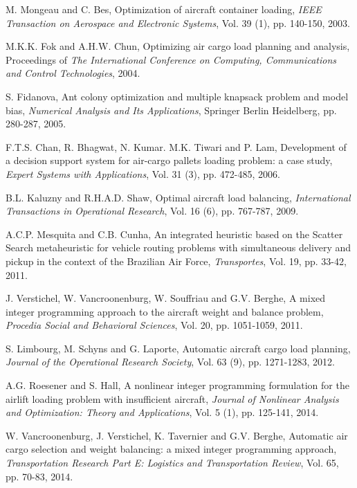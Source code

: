 \documentclass[preprint]{elsarticle}
\begin{document}
\begin{thebibliography}{00}
 M. Mongeau and C. Bes, Optimization of aircraft container loading, {\it IEEE Transaction on Aerospace and Electronic Systems}, Vol. 39 (1), pp. 140-150, 2003.

 M.K.K. Fok and A.H.W. Chun, Optimizing air cargo load planning and analysis, Proceedings of {\it The International Conference on Computing, Communications and Control Technologies}, 2004.

 S. Fidanova, Ant colony optimization and multiple knapsack problem and model bias, {\it Numerical Analysis and Its Applications}, Springer Berlin Heidelberg, pp. 280-287, 2005.

 F.T.S. Chan, R. Bhagwat, N. Kumar. M.K. Tiwari and P. Lam, Development of a decision support system for air-cargo pallets loading problem: a case study, {\it Expert Systems with Applications}, Vol. 31 (3), pp. 472-485, 2006.

 B.L. Kaluzny and R.H.A.D. Shaw, Optimal aircraft load balancing, {\it International Transactions in Operational Research}, Vol. 16 (6), pp. 767-787, 2009.

 A.C.P. Mesquita and C.B. Cunha, An integrated heuristic based on the Scatter Search metaheuristic for vehicle routing problems with simultaneous delivery and pickup in the context of the Brazilian Air Force, {\it Transportes}, Vol. 19, pp. 33-42, 2011.

 J. Verstichel, W. Vancroonenburg, W. Souffriau and G.V. Berghe, A mixed integer programming approach to the aircraft weight and balance problem, {\it Procedia Social and Behavioral Sciences}, Vol. 20, pp. 1051-1059, 2011.

 S. Limbourg, M. Schyns and G. Laporte, Automatic aircraft cargo load planning, {\it Journal of the Operational Research Society}, Vol. 63 (9), pp. 1271-1283, 2012.

 A.G. Roesener and S. Hall, A nonlinear integer programming formulation for the airlift loading problem with insufficient aircraft, {\it Journal of Nonlinear Analysis and Optimization: Theory and Applications}, Vol. 5 (1), pp. 125-141, 2014.

 W. Vancroonenburg, J. Verstichel, K. Tavernier and G.V. Berghe, Automatic air cargo selection and weight balancing: a mixed integer programming approach, {\it Transportation Research Part E: Logistics and Transportation Review}, Vol. 65, pp. 70-83, 2014.


\end{thebibliography}
\end{document}
